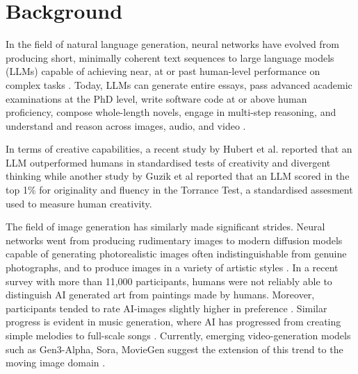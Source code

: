 \section{Background}

In the field of natural language generation, neural networks have evolved from producing short, minimally coherent text sequences \cite{Bengio2003-xn, Sutskever2011-ne, Graves2013-yv} to large language models (LLMs) capable of achieving near, at or past human-level performance on complex tasks \cite{Vaswani2017-pb, Brown2020-js, Thoppilan2022-jf, OpenAI2023-lt, Anthropic2024-tc, DeepSeek-AI2025-ai, Gemini-Team2024-wk}. Today, LLMs can generate entire essays, pass advanced academic examinations at the PhD level, write software code at or above human proficiency, compose whole-length novels, engage in multi-step reasoning, and understand and reason across images, audio, and video \cite{Gemini-Team2023-ux, OpenAI2024-em}. 

In terms of creative capabilities, a recent study by Hubert et al. reported that an LLM outperformed humans in standardised tests of creativity and divergent thinking \cite{Hubert2024-kv} while another study by Guzik et al \cite{Guzik2023-cl} reported that an LLM scored in the top 1\% for originality and fluency in the Torrance Test, a standardised assesment used to measure human creativity. 

The field of image generation has similarly made significant strides. Neural networks went from producing rudimentary images \cite{Goodfellow2014-jz, Mordvintsev2015-oz} to modern diffusion models capable of generating photorealistic images often indistinguishable from genuine photographs, and to produce images in a variety of artistic styles \cite{Ramesh2021-xb, Rombach2021-wf, Ho2020-zj, OpenAI2021-te, Nichol2021-ne, Zhang2023-by}. In a recent survey with more than 11,000 participants, humans were not reliably able to distinguish AI generated art from paintings made by humans. Moreover, participants tended to rate AI-images slightly higher in preference \cite{Alexander2024-pz}. Similar progress is evident in music generation, where AI has progressed from creating simple melodies \cite{Huang2018-pc, Dhariwal2020-au, Roberts2019-ym} to full-scale songs \cite{Copet2023-mh, Suno2024-wa, Udio2024-rc}. Currently, emerging video-generation models such as Gen3-Alpha, Sora, MovieGen suggest the extension of this trend to the moving image domain \cite{Runway2024-zs, Polyak2024-lh, OpenAI2024-ua}.

